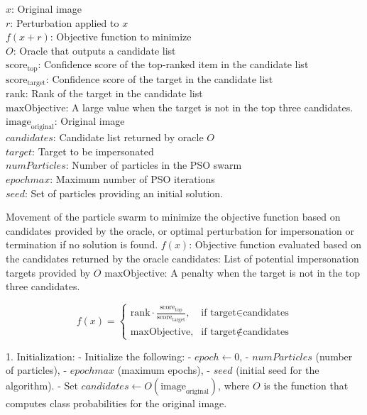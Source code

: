 $x$: Original image \\
$r$: Perturbation applied to $x$ \\
$f(x + r)$: Objective function to minimize \\
$O$: Oracle that outputs a candidate list \\
$\text{score}_{\text{top}}$: Confidence score of the top-ranked item in the candidate list \\
$\text{score}_{\text{target}}$: Confidence score of the target in the candidate list \\
$\text{rank}$: Rank of the target in the candidate list \\
$\text{maxObjective}$: A large value when the target is not in the top three candidates. \\
$\text{image}_{\text{original}}$: Original image \\
$candidates$: Candidate list returned by oracle $O$ \\
$target$: Target to be impersonated \\
$numParticles$: Number of particles in the PSO swarm \\
$epochmax$: Maximum number of PSO iterations \\
$seed$: Set of particles providing an initial solution.

Movement of the particle swarm to minimize the objective function based on candidates provided by the oracle, or optimal perturbation for impersonation or termination if no solution is found.
$f(x)$: Objective function evaluated based on the candidates returned by the oracle $\text{candidates}$: List of potential impersonation targets provided by $O$  $\text{maxObjective}$: A penalty when the target is not in the top three candidates.

\begin{equation}
f(x) = 
\begin{cases} 
\text{rank} \cdot \frac{\text{score}_{\text{top}}}{\text{score}_{\text{target}}}, & \text{if target} \in \text{candidates} \\
\text{maxObjective}, & \text{if target} \notin \text{candidates}
\end{cases}
\end{equation}

1. Initialization:
   - Initialize the following:
     - $epoch \gets 0$,
     - $numParticles$ (number of particles),
     - $epochmax$ (maximum epochs),
     - $seed$ (initial seed for the algorithm).
   - Set $candidates \gets O(\text{image}_{\text{original}})$, where $O$ is the function that computes class probabilities for the original image.


